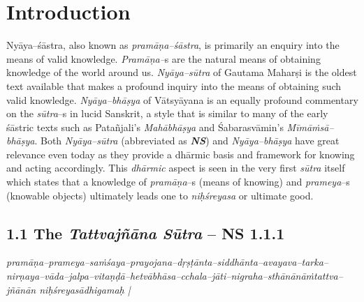 
\chapter{Introduction}\label{chapter1}

\vspace{-.2cm}

Nyāya–śāstra, also known as \textit{pramāṇa–śāstra}, is primarily an enquiry into the means of valid knowledge. \textit{Pramāṇa–}s are the natural means of obtaining knowledge of the world around us. \textit{Nyāya–sūtra} of Gautama Maharṣi  is the oldest text available that makes a profound inquiry into the means of obtaining such valid knowledge. \textit{Nyāya–bhāṣya} of Vātsyāyana is an equally profound commentary on the \textit{sūtra}–s in lucid Sanskrit, a style that is similar to many of the early śāstric texts such as Patañjali’s \textit{Mahābhāṣya} and Śabarasvāmin’s \textit{Mīmāṁsā–bhāṣya}. Both \textit{Nyāya–sūtra }(abbreviated as \textit{\textbf{NS}}) and \textit{Nyāya–bhāṣya} have great relevance even today as they provide a dhārmic basis and framework for knowing and acting accordingly. This \textit{dhārmic} aspect is seen in the very first \textit{sūtra} itself which states that a knowledge of \textit{pramāṇa}–s (means of knowing) and \textit{prameya}–s (knowable objects) ultimately leads one to \textit{niḥśreyasa} or ultimate good.

\vspace{-.3cm}

\section*{1.1 The {\it {\bfseries Tattvajñāna Sūtra}} – NS 1.1.1}

\begin{myquote}
\textit{pramāṇa–prameya–saṁśaya–prayojana–dṛṣṭānta–siddhānta–avayava–tarka–\break nirṇaya–vāda–jalpa–vitaṇḍā–hetvābhāsa–cchala–jāti–nigraha–sthānānāṁ\break tattva–jñānān niḥśreyasādhigamaḥ |}
\end{myquote}

